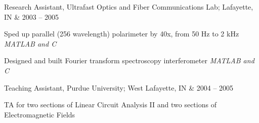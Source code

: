 \documentclass[letterpaper]{scrartcl}
\begin{document}
\begin{list1}
%			  
%
%



	\item \begin{tabular1bold} Research Assistant, Ultrafast Optics and Fiber Communications Lab; Lafayette, IN & 2003 -- 2005 \end{tabular1bold}

	\begin{list2}
		\item Sped up parallel (256 wavelength) polarimeter by 40x, from 50 Hz to 2 kHz \hfill \emph{MATLAB and C}
		\item Designed and built Fourier transform spectroscopy interferometer \hfill \emph{MATLAB and C}
	\end{list2}
	\item \begin{tabular1bold} Teaching Assistant, Purdue University; West Lafayette, IN & 2004 -- 2005 \end{tabular1bold}

	\begin{list2}
		\item TA for two sections of Linear Circuit Analysis II and two sections of Electromagnetic Fields 
	\end{list2}


\end{list1}
\end{document}
